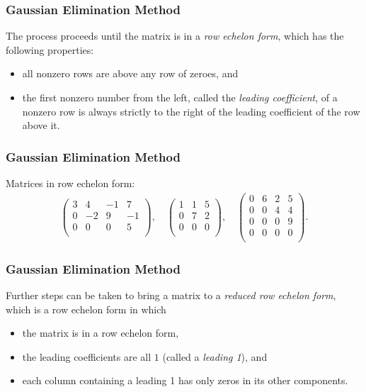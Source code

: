 \begin{frame}
  \frametitle{Gaussian Elimination Method}
  The process proceeds until the matrix is in a \emph{row echelon form}, which has the following properties:
  \begin{itemize}
    \item all nonzero rows are above any row of zeroes, and
    \item the first nonzero number from the left, called the \emph{leading coefficient}, of a nonzero row is always strictly to the right of the leading coefficient of the row above it.
  \end{itemize}
\end{frame}

\begin{frame}
  \frametitle{Gaussian Elimination Method}
  \begin{presentation_example}
    Matrices in row echelon form:
    \begin{align*}
      \begin{pmatrix}
        3 & 4 & -1 & 7\\
        0 & -2 & 9 & -1\\
        0 & 0 & 0 & 5\\
      \end{pmatrix},\quad
      \begin{pmatrix}
        1 & 1 & 5\\
        0 & 7 & 2\\
        0 & 0 & 0 \\
      \end{pmatrix},\quad
      \begin{pmatrix}
        0 & 6 & 2 & 5\\
        0 & 0 & 4 & 4\\
        0 & 0 & 0 & 9\\
        0 & 0 & 0 & 0\\
      \end{pmatrix}.
    \end{align*}
  \end{presentation_example}
\end{frame}

\begin{frame}
  \frametitle{Gaussian Elimination Method}
  Further steps can be taken to bring a matrix to a \emph{reduced row echelon form}, which is a row echelon form in which
  \begin{itemize}
    \item the matrix is in a row echelon form,
    \item the leading coefficients are all $1$ (called a \emph{leading 1}), and
    \item each column containing a leading 1 has only zeros in its other components.
  \end{itemize}
\end{frame}

